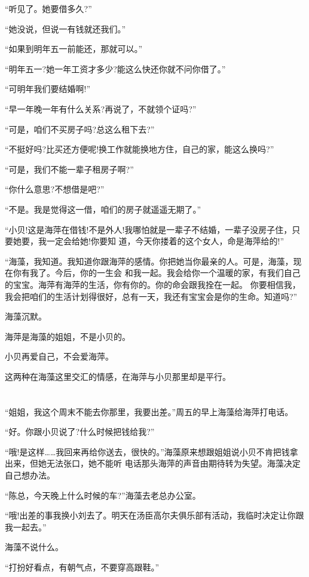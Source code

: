 \documentclass[11pt,a4paper,onecolumn]{article}
\begin{document}
``听见了。她要借多久?''

``她没说，但说一有钱就还我们。''

``如果到明年五一前能还，那就可以。''

``明年五一?她一年工资才多少?能这么快还你就不问你借了。''

``可明年我们要结婚啊!''

``早一年晚一年有什么关系?再说了，不就领个证吗?''

``可是，咱们不买房子吗?总这么租下去?''

``不挺好吗?比买还方便呢!换工作就能换地方住，自己的家，能这么换吗?''

``可是，我们不能一辈子租房子啊?''

``你什么意思?不想借是吧?''

``不是。我是觉得这一借，咱们的房子就遥遥无期了。''

``小贝!这是海萍在借钱!不是外人!我哪怕就是一辈子不结婚，一辈子没房子住，只要她要，我一定会给她!你要知
道，今天你搂着的这个女人，命是海萍给的!''

``海藻，我知道。我知道你跟海萍的感情。你把她当你最亲的人。可是，海藻，现在你有我了。今后，你的一生会
和我一起。我会给你一个温暖的家，有我们自己的宝宝。海萍有海萍的生活，你有你的。你的命会跟我拴在一起。
你要相信我，我会把咱们的生活计划得很好，总有一天，我还有宝宝会是你的生命。知道吗?''

海藻沉默。

海萍是海藻的姐姐，不是小贝的。

小贝再爱自己，不会爱海萍。

这两种在海藻这里交汇的情感，在海萍与小贝那里却是平行。

\section[\thesection]{}

``姐姐，我这个周末不能去你那里，我要出差。''周五的早上海藻给海萍打电话。

``好。你跟小贝说了?什么时候把钱给我?''

``哦!是这样……我回来再给你送去，很快的。''海藻原来想跟姐姐说小贝不肯把钱拿出来，但她无法张口，她不能听
电话那头海萍的声音由期待转为失望。海藻决定自己想办法。

``陈总，今天晚上什么时候的车?''海藻去老总办公室。

``哦!出差的事我换小刘去了。明天在汤臣高尔夫俱乐部有活动，我临时决定让你跟我一起去。''

海藻不说什么。

``打扮好看点，有朝气点，不要穿高跟鞋。''
\end{document}
